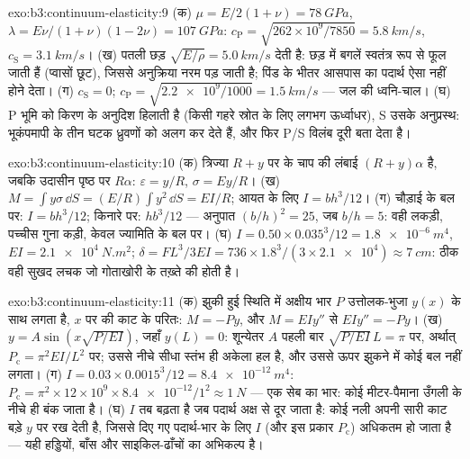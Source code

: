 \begin{solution}{exo:b3:continuum-elasticity:9}
(क) $\mu = E/2(1+\nu) = \qty{78}{GPa}$, $\lambda = E\nu/(1+\nu)(1-2\nu)
= \qty{107}{GPa}$: $c_{\text{P}} = \sqrt{262\times10^9/7850} =
\qty{5.8}{km/s}$, $c_{\text{S}} = \qty{3.1}{km/s}$। (ख) पतली छड़
$\sqrt{E/\rho} = \qty{5.0}{km/s}$ देती है: छड़ में बगलें स्वतंत्र रूप
से फूल जाती हैं (प्वासों छूट), जिससे अनुक्रिया नरम पड़ जाती है; पिंड के
भीतर आसपास का पदार्थ ऐसा नहीं होने देता। (ग) $c_{\text{S}} = 0$;
$c_{\text{P}} = \sqrt{\num{2.2e9}/1000} = \qty{1.5}{km/s}$ --- जल की
ध्वनि-चाल। (घ) P भूमि को किरण के अनुदिश हिलाती है
(किसी गहरे स्रोत के लिए लगभग ऊर्ध्वाधर), S उसके अनुप्रस्थ: भूकंपमापी के
तीन घटक ध्रुवणों को अलग कर देते हैं, और फिर P/S विलंब दूरी बता देता है।
\end{solution}

\begin{solution}{exo:b3:continuum-elasticity:10}
(क) त्रिज्या $R + y$ पर के चाप की लंबाई $(R + y)\alpha$ है, जबकि
उदासीन पृष्ठ पर $R\alpha$: $\varepsilon = y/R$, $\sigma =
Ey/R$। (ख) $M = \int y\sigma\,\dd S = (E/R)\int y^2\,\dd S = EI/R$;
आयत के लिए $I = bh^3/12$। (ग) चौड़ाई के बल पर: $I = bh^3/12$; किनारे पर:
$hb^3/12$ --- अनुपात $(b/h)^2 = 25$, जब $b/h = 5$: वही लकड़ी, पच्चीस
गुना कड़ी, केवल ज्यामिति के बल पर। (घ) $I = 0.50 \times
0.035^3/12 = \qty{1.8e-6}{m^4}$, $EI = \qty{2.1e4}{N.m^2}$; $\delta =
FL^3/3EI = 736 \times 1.8^3/(3 \times \num{2.1e4}) \approx
\qty{7}{cm}$: ठीक वही सुखद लचक जो गोताखोरी के तख़्ते की होती है।
\end{solution}

\begin{solution}{exo:b3:continuum-elasticity:11}
(क) झुकी हुई स्थिति में अक्षीय भार $P$ उत्तोलक-भुजा $y(x)$ के साथ
लगता है, $x$ पर की काट के परितः: $M = -Py$, और $M = EIy''$ से
$EIy'' = -Py$। (ख) $y = A\sin(x\sqrt{P/EI})$, जहाँ $y(L) = 0$: शून्येतर
$A$ पहली बार $\sqrt{P/EI}\,L = \pi$ पर, अर्थात् $P_{\text{c}} =
\pi^2EI/L^2$ पर; उससे नीचे सीधा स्तंभ ही अकेला हल है, और उससे ऊपर
झुकने में कोई बल नहीं लगता। (ग) $I = 0.03 \times 0.0015^3/12 =
\qty{8.4e-12}{m^4}$: $P_{\text{c}} = \pi^2 \times 12\times10^9 \times
\num{8.4e-12}/1^2 \approx \qty{1}{N}$ --- एक सेब का भार: कोई
मीटर-पैमाना उँगली के नीचे ही बंक जाता है। (घ) $I$ तब बढ़ता है जब पदार्थ
अक्ष से दूर जाता है: कोई नली अपनी सारी काट बड़े $y$ पर रख देती है,
जिससे दिए गए पदार्थ-भार के लिए $I$ (और इस प्रकार $P_{\text{c}}$)
अधिकतम हो जाता है --- यही हड्डियों, बाँस और साइकिल-ढाँचों का अभिकल्प है।
\end{solution}

